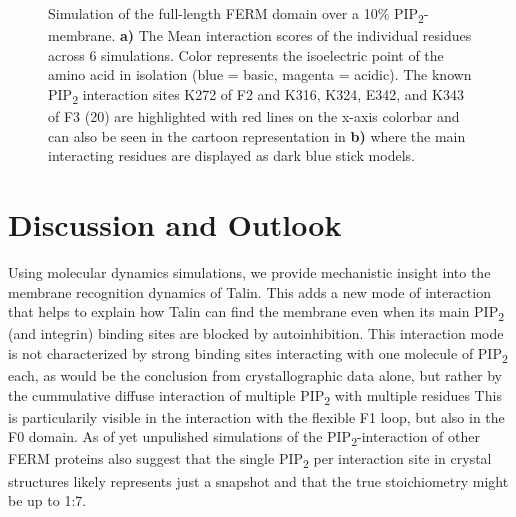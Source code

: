 \documentclass[
  twocolumn]{biophys-new-mod}
\begin{document}
\begin{figure}
\begin{minipage}[t]{\linewidth}
{}

\subcaption{\label{fig-ferm-memb-system}~}
\end{minipage}%

\caption{\label{fig-ferm-further}Simulation of the full-length FERM
domain over a 10\% PIP\textsubscript{2}-membrane. \textbf{a)} The Mean
interaction scores of the individual residues across 6 simulations.
Color represents the isoelectric point of the amino acid in isolation
(blue = basic, magenta = acidic). The known PIP\textsubscript{2}
interaction sites K272 of F2 and K316, K324, E342, and K343 of F3 (20)
are highlighted with red lines on the x-axis colorbar and can also be
seen in the cartoon representation in \textbf{b)} where the main
interacting residues are displayed as dark blue stick models.}

\end{figure}

\hypertarget{discussion-and-outlook}{%
\section{Discussion and Outlook}\label{discussion-and-outlook}}

Using molecular dynamics simulations, we provide mechanistic insight
into the membrane recognition dynamics of Talin. This adds a new mode of
interaction that helps to explain how Talin can find the membrane even
when its main PIP\textsubscript{2} (and integrin) binding sites are
blocked by autoinhibition. This interaction mode is not characterized by
strong binding sites interacting with one molecule of
PIP\textsubscript{2} each, as would be the conclusion from
crystallographic data alone, but rather by the cummulative diffuse
interaction of multiple PIP\textsubscript{2} with multiple residues This
is particularily visible in the interaction with the flexible F1 loop,
but also in the F0 domain. As of yet unpulished simulations of the
PIP\textsubscript{2}-interaction of other FERM proteins also suggest
that the single PIP\textsubscript{2} per interaction site in crystal
structures likely represents just a snapshot and that the true
stoichiometry might be up to 1:7.
\end{document}
